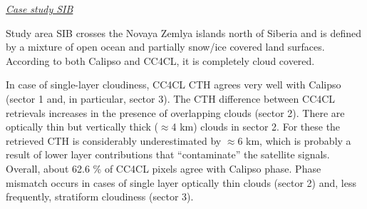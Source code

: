 \vspace{5mm}\underline{\textit{Case study SIB}}\vspace{2mm}

Study area SIB crosses the Novaya Zemlya islands north of Siberia and is defined by a mixture of open ocean and partially snow/ice covered land surfaces. According to both Calipso and CC4CL, it is completely cloud covered. 

In case of single-layer cloudiness, CC4CL CTH agrees very well with Calipso (sector 1 and, in particular, sector 3). The CTH difference between CC4CL retrievals increases in the presence of overlapping clouds (sector 2). There are optically thin but vertically thick ($\approx$4 km) clouds in sector 2. For these the retrieved CTH is considerably underestimated by $\approx$6 km, which is probably a result of lower layer contributions that ``contaminate'' the satellite signals. Overall, about 62.6 \% of CC4CL pixels agree with Calipso phase. Phase mismatch occurs in cases of single layer optically thin clouds (sector 2) and, less frequently, stratiform cloudiness (sector 3).



